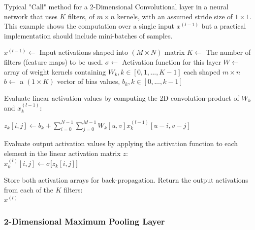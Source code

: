 \documentclass[12pt,letterpaper]{article}
\begin{document}
\begin{algorithm}[H]
\caption{Typical "Call" method for a 2-Dimensional Convolutional layer in a neural network that uses $K$ filters, of $m \times n$ kernels, with an assumed stride size of $1 \times 1$. This example shows the computation over a single input $x^{(l-1)}$ but a practical implementation should include mini-batches of samples.}
\label{alg-CallConv2D}

\begin{algorithmic}
\REQUIRE $x^{(l-1)} \leftarrow$ Input activations shaped into $(M \times N)$ matrix
\REQUIRE $K \leftarrow$ The number of filters (feature maps) to be used.
\REQUIRE $\sigma \leftarrow$ Activation function for this layer
\REQUIRE $W \leftarrow$ array of weight kernels containing $W_k, k \in [0,1,...,K-1]$ each shaped $m \times n$ \\
\REQUIRE $b \leftarrow$ a $(1 \times K)$ vector of bias values, $b_k, k \in [0,...,k-1]$ \\

	\item Evaluate linear activation values by computing the 2D convolution-product of 
	$W_{k}$ and $x^{(l-1)}_{k}$:\\
	\item $z_{k}[i,j] \leftarrow b_{k} + 
	\sum_{i=0}^{N-1}\sum_{j=0}^{M-1} W_{k}[u,v] x^{(l-1)}_{k}[u-i,v-j]$ \\
	\item Evaluate output activation values by applying the activation function to each element in the linear activation matrix $z$:\\
	$x^{(l)}_{k}[i,j] \leftarrow \sigma\big[ z_{k}[i,j] \big]$ \\
\ENDFOR

Store both activation arrays for back-propagation. Return the output activations from each of the $K$ filters:\\
\RETURN $x^{(l)}$

\end{algorithmic}
\end{algorithm}


\subsubsection{2-Dimensional Maximum Pooling Layer}
\label{subsubsec-2DPool}
\end{document}
